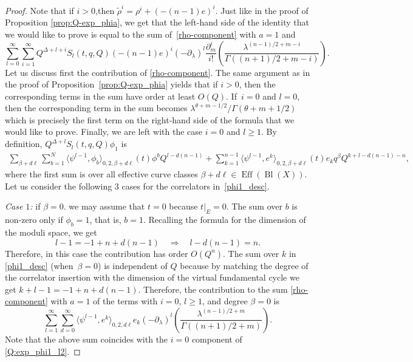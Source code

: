 \documentclass[10pt,a4paper]{article}
\numberwithin{equation}{section}
\begin{document}
\begin{proof}
Note that if $i>0$,then $\widetilde{\rho}^i=\rho^i+(-(n-1)e)^i.$
Just like in the proof of Proposition \ref{prop:Q-exp_phia}, we get that the left-hand side of the identity that we would like to prove is equal to the sum of~\eqref{rho-component} with $a=1$ and
\begin{equation}\label{e-component}
\sum_{l=0}^\infty
\sum_{i=1}^\infty
Q^{\Delta+l+i} S_l(t,q,Q) (-(n-1)e)^i
(-\partial_\lambda)^l
\frac{\partial_m^i}{i!}\left(
\frac{\lambda^{(n-1)/2+m-i}}{
\Gamma((n+1)/2+m-i)}
\right).
\end{equation}
Let us discuss first the contribution of \eqref{rho-component}. The same argument as in the proof of Proposition~\ref{prop:Q-exp_phia} yields that if $i>0$, then the corresponding terms in the sum have order at least $O(Q)$. If~$i=0$ and $l=0$, then the corresponding term in the sum becomes $\lambda^{\theta+m-1/2}/\Gamma(\theta+m+1/2)$ which is precisely the first term on the right-hand side of the formula that we would like to prove.
Finally, we are left with the case $i=0$ and $l\geq 1$. By definition, $Q^{\Delta+l}S_l(t,q,Q)\phi_1$ is
\begin{gather}\label{phi1_desc}
\sum_{\beta+d\ell }\!
\sum_{b=1}^N\!
\big\langle \psi^{l-1},\phi_b\big\rangle_{0,2,\beta+d\ell} (t) \phi^b Q^{l-d(n-1)} +
\!\sum_{k=1}^{n-1}\!
\big\langle \psi^{l-1}, e^k\big\rangle_{0,2,\beta+d\ell} (t) e_k q^\beta Q^{k+l-d(n-1)-n},\!\!\!
\end{gather}
where the first sum is over all effective curve classes $\beta+d\ell\in \operatorname{Eff}(\operatorname{Bl}(X))$. Let us consider the following 3 cases for the correlators in~\eqref{phi1_desc}.

{\em Case $1$:} if $\beta=0$. we may assume that $t=0$ because $t|_E=0$. The sum over $b$ is non-zero only if $\phi_b=1$, that is, $b=1$. Recalling the formula for the dimension of the moduli space, we get
\[
l-1= -1+n+d(n-1)\quad\Rightarrow\quad
l-d(n-1) = n.
\]
Therefore, in this case the contribution has order $O(Q^n)$. The sum over $k$ in \eqref{phi1_desc} (when~$\beta=0$) is independent of $Q$ because by matching the degree of the correlator insertion with the dimension of the virtual fundamental cycle we get $k+l-1=-1+n+d(n-1)$. Therefore, the contribution to the sum \eqref{rho-component} with $a=1$ of the terms with $i=0$, $l\geq 1$, and degree $\beta=0$ is
\[
\sum_{l=1}^\infty
\sum_{d=0}^\infty
\big\langle \psi^{l-1}, e^k\big\rangle_{0,2,d\ell}
e_k
(-\partial_\lambda)^l
\left(
\frac{\lambda^{(n-1)/2+m}}{
\Gamma((n+1)/2+m)}
\right).
\]
Note that the above sum coincides with the $i=0$ component of \eqref{Q:exp_phi1_l2}.


\end{proof}
\end{document}
